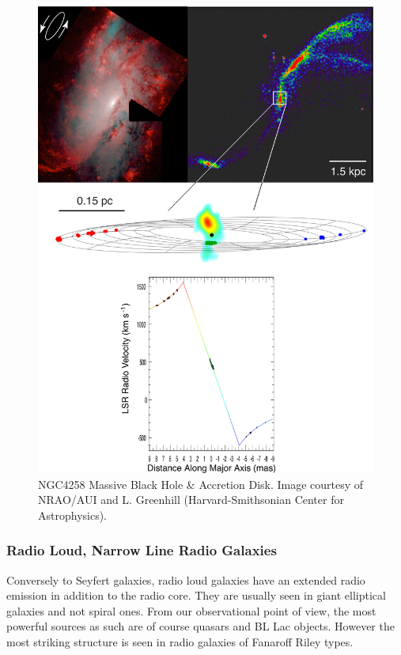 \documentclass[10pt,a4paper,english]{article}
\begin{document}
\begin{figure}[!ht]
\begin{minipage}{.49\textwidth}
    \end{minipage}%
    \hfill
    \begin{minipage}{.49\textwidth}
        \includegraphics[width=\textwidth]{ngc4258_combo_hst_hi.jpg}
    \end{minipage}
        \caption{
            NGC4258 Massive Black Hole \& Accretion Disk. Image courtesy of
            NRAO/AUI and L. Greenhill (Harvard-Smithsonian Center for
            Astrophysics).
        }
\end{figure}

\subsubsection{Radio Loud, Narrow Line Radio Galaxies}

Conversely to Seyfert galaxies, radio loud galaxies have an extended radio
emission in addition to the radio core. They are usually seen in giant
elliptical galaxies and not spiral ones. From our observational point of view,
the most powerful sources as such are of course quasars and BL Lac objects.
However the most striking structure is seen in radio galaxies of Fanaroff Riley
types.
\end{document}
